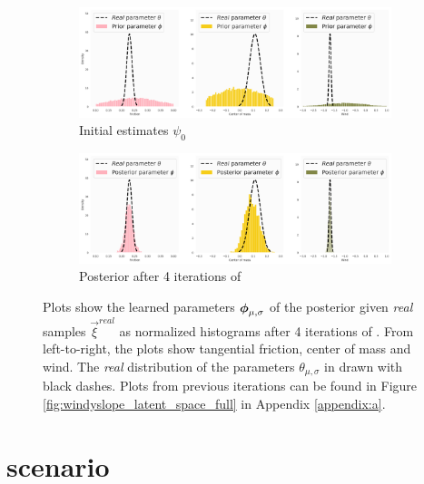 \begin{figure}[h!]
\centering
\captionsetup{size=footnotesize}
\begin{subfigure}{\linewidth}
  \includegraphics[width=1.0\linewidth]{img/windyslope/latent-representation/iter0_style_phi}
  \caption{Initial estimates $\psi_0$}
\end{subfigure}
\begin{subfigure}{\textwidth}
  \includegraphics[width=1.0\linewidth]{img/windyslope/latent-representation/iter4_10_style}
  \caption{Posterior after 4 iterations of \dettostoc{}}
\end{subfigure}
\caption{Plots show the learned parameters $\boldsymbol{\phi}_{\mu, \sigma}$ of the posterior given \emph{real} samples $\vec{\xi}^{real}$ as normalized histograms after 4 iterations of \dettostoc{}.
From left-to-right, the plots show tangential friction, center of mass and wind. %
The \emph{real} distribution of the parameters $\theta_{\mu, \sigma}$ in drawn with black dashes. Plots from previous iterations can be found in Figure \ref{fig:windyslope_latent_space_full} in Appendix \ref{appendix:a}.}
\label{fig:windyslope_latent_space}
\end{figure}

\clearpage
\section{\yp{} scenario}

